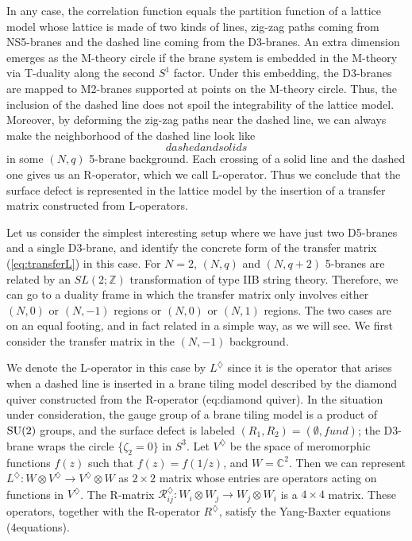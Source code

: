 In any case, the correlation function equals the partition function
of a lattice model whose lattice is made of two kinds of lines, zig-zag
paths coming from NS5-branes and the dashed line coming from the D3-branes.
An extra dimension emerges as the M-theory circle if the brane system
is embedded in the M-theory via T-duality along the second $S^{1}$
factor. Under this embedding, the D3-branes are mapped to M2-branes
supported at points on the M-theory circle. Thus, the inclusion of
the dashed line does not spoil the integrability of the lattice model.
Moreover, by deforming the zig-zag paths near the dashed line, we
can always make the neighborhood of the dashed line look like 
\begin{equation}
dashedandsolids  \label{eq:transferL}
\end{equation}
in some $\left(N,q\right)$ 5-brane background. Each crossing of a
solid line and the dashed one gives us an R-operator, which we call
L-operator. Thus we conclude that the surface defect is represented
in the lattice model by the insertion of a transfer matrix constructed
from L-operators. 

Let us consider the simplest interesting setup where we have just
two D5-branes and a single D3-brane, and identify the concrete form
of the transfer matrix (\ref{eq:transferL}) in this case. For $N=2$,
$\left( N,q \right)$ and $\left( N,q+2 \right)$ 5-branes are related
by an $SL(2;\mathbb{Z})$ transformation of type IIB string theory.
Therefore, we can go to a duality frame in which the transfer matrix
only involves either $\left( N,0 \right)$ or $\left( N,-1 \right)$ regions
or $\left( N,0 \right)$ or $\left( N,1 \right)$ regions. The two cases
are on an equal footing, and in fact related in a simple way, as we
will see. We first consider the transfer matrix in the $\left( N,-1 \right)$
background. 

We denote the L-operator in this case by $L^{\diamondsuit}$ since
it is the operator that arises when a dashed line is inserted in a
brane tiling model described by the diamond quiver constructed from
the R-operator (eq:diamond quiver). In the situation under consideration,
the gauge group of a brane tiling model is a product of $\mathrm{SU}(2)$ groups,
and the surface defect is labeled $\left( R_{1},R_{2} \right)=\left( \emptyset,fund \right)$;
the D3-brane wraps the circle $\{\zeta_{2}=0\}$ in $S^{3}$. Let
$V^{\diamondsuit}$ be the space of meromorphic functions $f(z)$
such that $f(z)=f(1/z)$, and $W=\mathbb{C}^{2}$. Then we can represent
$L^{\diamondsuit}:W\otimes V^{\diamondsuit}\rightarrow V^{\diamondsuit}\otimes W$
as $2\times2$ matrix whose entries are operators acting on functions
in $V^{\diamondsuit}$. The R-matrix $\mathcal{R}_{ij}^{\diamondsuit}:W_{i}\otimes W_{j}\rightarrow W_{j}\otimes W_{i}$
is a $4\times4$ matrix. These operators, together with the R-operator
$R^{\diamondsuit}$, satisfy the Yang-Baxter equations (4equations). 

